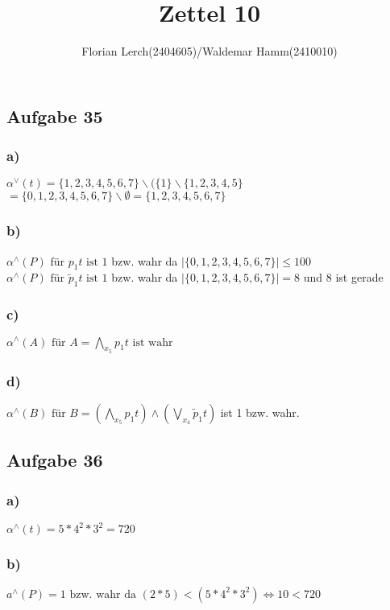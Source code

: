 \documentclass[11pt]{amsart}
\title{Zettel 10}
\author{Florian Lerch(2404605)/Waldemar Hamm(2410010)}
\begin{document}
\maketitle

\subsection*{Aufgabe 35}

\subsubsection*{a)}
\( \alpha^{\vee}(t) = \{1,2,3,4,5,6,7\} \backslash ( \{1\} \backslash \{1,2,3,4,5\} \) \\
\( = \{0,1,2,3,4,5,6,7\} \backslash \emptyset = \{1,2,3,4,5,6,7\} \)

\subsubsection*{b)}
\( \alpha^{\wedge}(P) \mbox{ für } p_1t \mbox{ ist } 1\) bzw. wahr da \( | \{0,1,2,3,4,5,6,7\} | \leq 100 \) \\
\( \alpha^{\wedge}(P) \mbox{ für } \tilde{p}_1t \mbox{ ist } 1\) bzw. wahr da \( | \{0,1,2,3,4,5,6,7\} | = 8\) und 8 ist gerade \\

\subsubsection*{c)}
\( \alpha^{\wedge}(A) \mbox{ für } A = \bigwedge_{x_5}p_1t \mbox{ ist wahr} \)

\subsubsection*{d)}
\( \alpha^{\wedge}(B) \mbox{ für } B = (\bigwedge_{x_5}p_1t)\wedge(\bigvee_{x_4}\tilde{p}_1t) \) ist 1 bzw. wahr.

\subsection*{Aufgabe 36}

\subsubsection*{a)}
\( \alpha^{\wedge}(t) =  5*4^2*3^2 = 720 \)

\subsubsection*{b)}
\( a^{\wedge}(P) = 1 \mbox{ bzw. wahr da } (2 * 5) < (5 * 4^2 * 3^2) \Leftrightarrow 10 < 720 \)
\end{document}
